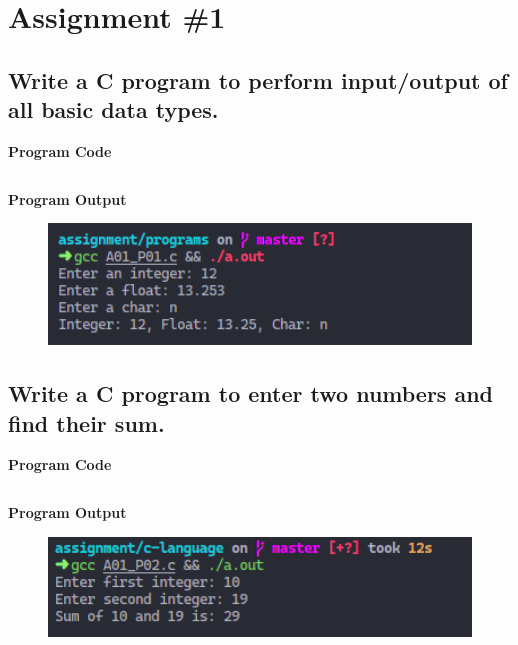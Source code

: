 \documentclass[a4paper, onecolumn]{article}
\begin{document}

\tableofcontents
\newpage
{}


\section{Assignment \#1}


\subsection{Write a C program to perform input/output of all basic data types.}
\textbf{Program Code}

\inputminted{C}{programs/A01_P01.c}

\textbf{Program Output}

\begin{figure}[h]
  \includegraphics[width=12cm]{A01_P01.png}
\end{figure}

\newpage



\subsection{Write a C program to enter two numbers and find their sum.}
\textbf{Program Code}

\inputminted{C}{programs/A01_P02.c}

\textbf{Program Output}

\begin{figure}[h]
  \includegraphics[width=12cm]{A01_P02}
\end{figure}

\newpage
\end{document}
